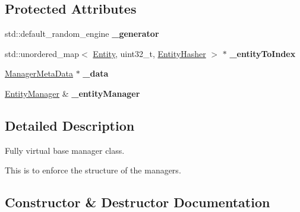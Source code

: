 \subsection*{Protected Attributes}
\begin{DoxyCompactItemize}
\item 
std\+::default\+\_\+random\+\_\+engine {\bfseries \+\_\+generator}\hypertarget{class_ensum_1_1_components_1_1_manager_aea13da4e297ed8c902ec32ef074e3e70}{}\label{class_ensum_1_1_components_1_1_manager_aea13da4e297ed8c902ec32ef074e3e70}

\item 
std\+::unordered\+\_\+map$<$ \hyperlink{struct_ensum_1_1_components_1_1_entity}{Entity}, uint32\+\_\+t, \hyperlink{struct_ensum_1_1_components_1_1_entity_hasher}{Entity\+Hasher} $>$ $\ast$ {\bfseries \+\_\+entity\+To\+Index}\hypertarget{class_ensum_1_1_components_1_1_manager_a60e97a2c011d3fae42b2a7e36bd0ffb8}{}\label{class_ensum_1_1_components_1_1_manager_a60e97a2c011d3fae42b2a7e36bd0ffb8}

\item 
\hyperlink{struct_ensum_1_1_components_1_1_manager_1_1_manager_meta_data}{Manager\+Meta\+Data} $\ast$ {\bfseries \+\_\+data}\hypertarget{class_ensum_1_1_components_1_1_manager_a6ff9f92350f25612b092e0330941a8e4}{}\label{class_ensum_1_1_components_1_1_manager_a6ff9f92350f25612b092e0330941a8e4}

\item 
\hyperlink{class_ensum_1_1_components_1_1_entity_manager}{Entity\+Manager} \& {\bfseries \+\_\+entity\+Manager}\hypertarget{class_ensum_1_1_components_1_1_manager_a24f14f5ffe72655f9183283a98e3a0a3}{}\label{class_ensum_1_1_components_1_1_manager_a24f14f5ffe72655f9183283a98e3a0a3}

\end{DoxyCompactItemize}


\subsection{Detailed Description}
Fully virtual base manager class. 

This is to enforce the structure of the managers. 

\subsection{Constructor \& Destructor Documentation}
